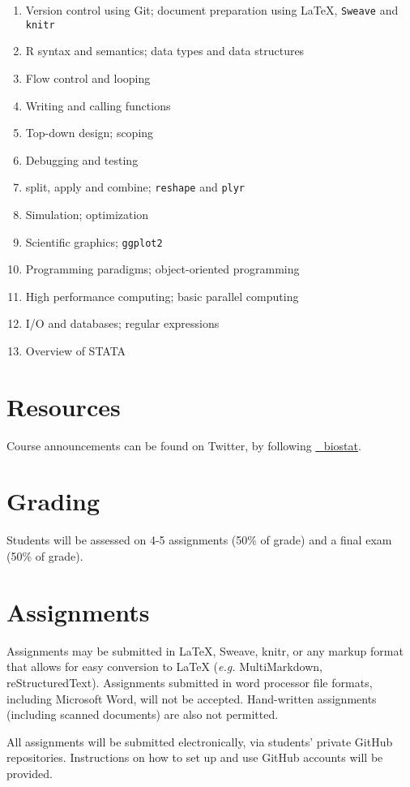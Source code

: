 \documentclass[11pt,oneside]{article}
\def\mybibliostyle{plain}
\def\mybibliocommand{}
\begin{document}
\begin{enumerate}

\item Version control using Git; document preparation using LaTeX, \texttt{Sweave} and \texttt{knitr}
\item R syntax and semantics; data types and data structures
\item Flow control and looping
\item Writing and calling functions
\item Top-down design; scoping
\item Debugging and testing
\item split, apply and combine; \texttt{reshape} and \texttt{plyr}
\item Simulation; optimization
\item Scientific graphics; \texttt{ggplot2}
\item Programming paradigms; object-oriented programming
\item High performance computing; basic parallel computing
\item I/O and databases; regular expressions
\item Overview of STATA
\end{enumerate}

\section{Resources}
\label{resources}

Course announcements can be found on Twitter, by following \href{https://twitter.com/#!/vandy_biostat}{\@vandy\_biostat}.

\section{Grading}
\label{grading}

Students will be assessed on 4-5 assignments (50\% of grade) and a final exam (50\% of grade).

\section{Assignments}
\label{assignments}

Assignments may be submitted in LaTeX, Sweave, knitr, or any markup format that allows for easy conversion to LaTeX ({\itshape e.g.} MultiMarkdown, reStructuredText). Assignments submitted in word processor file formats, including Microsoft Word, will not be accepted. Hand-written assignments (including scanned documents) are also not permitted.

All assignments will be submitted electronically, via students' private GitHub repositories. Instructions on how to set up and use GitHub accounts will be provided.


\mybibliocommand
\end{document}
